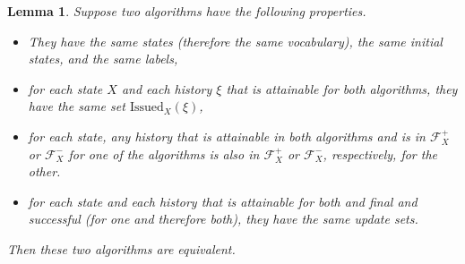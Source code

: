 \documentclass{LMCS}
\newtheorem{la}[thm]{Lemma}
\theoremstyle{definition}
\newenvironment{ls}{\begin{itemize}}{\end{itemize}}
\newcommand{\scr}[1]{\ensuremath{\mathcal {#1}}}
\newcommand{\Issued}{\text{Issued}}
\begin{document}
\begin{la}   \label{equiv-la}
Suppose two algorithms have the following properties.
\begin{ls}
  \item They have the same states (therefore the same vocabulary), the
  same initial states, and the same labels,
  \item for each state $X$ and each history $\xi$ that is attainable
  for both algorithms, they have the same set $\Issued_X(\xi)$,
  \item for each state, any history that is attainable in both
  algorithms and is in $\scr F_X^+$ or $\scr F_X^-$ for one of the
  algorithms is also in $\scr F_X^+$ or $\scr F_X^-$, respectively,
  for the other.
  \item for each state and each history that is attainable for both
  and final and successful (for one and therefore both), they have
  the same update sets.
\end{ls}
Then these two algorithms are equivalent.
\end{la}
\end{document}
